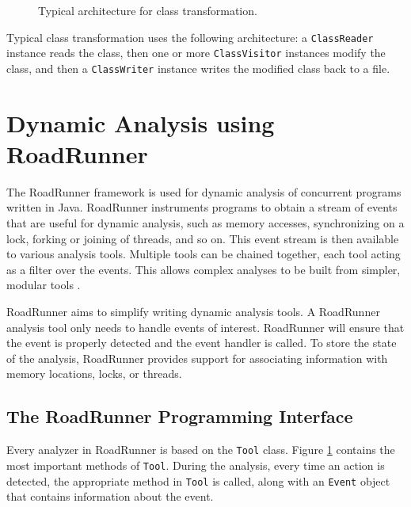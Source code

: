 \begin{figure}[hbt]
    
    \caption{Typical architecture for class transformation.}
\end{figure}

Typical class transformation uses the following architecture: a
\texttt{ClassReader} instance reads the class, then one or more
\texttt{ClassVisitor} instances modify the class, and then a
\texttt{ClassWriter} instance writes the modified class back to a file.

\section{Dynamic Analysis using RoadRunner}

The RoadRunner framework is used for dynamic analysis of concurrent programs
written in Java. RoadRunner instruments programs to obtain a stream of events
that are useful for dynamic analysis, such as memory accesses, synchronizing on
a lock, forking or joining of threads, and so on. This event stream is then
available to various analysis tools. Multiple tools can be chained together,
each tool acting as a filter over the events. This allows complex analyses to be
built from simpler, modular tools \cite{RoadRunner}.

RoadRunner aims to simplify writing dynamic analysis tools. A RoadRunner
analysis tool only needs to handle events of interest. RoadRunner will ensure
that the event is properly detected and the event handler is called. To store
the state of the analysis, RoadRunner provides support for associating
information with memory locations, locks, or threads.



\subsection{The RoadRunner Programming Interface}

Every analyzer in RoadRunner is based on the \texttt{Tool} class. Figure
\ref{toolclass} contains the most important methods of \texttt{Tool}. During the
analysis, every time an action is detected, the appropriate method in
\texttt{Tool} is called, along with an \texttt{Event} object that contains
information about the event.

\begin{figure}[hbt]
    \label{toolclass}
    \caption{}
\end{figure}

